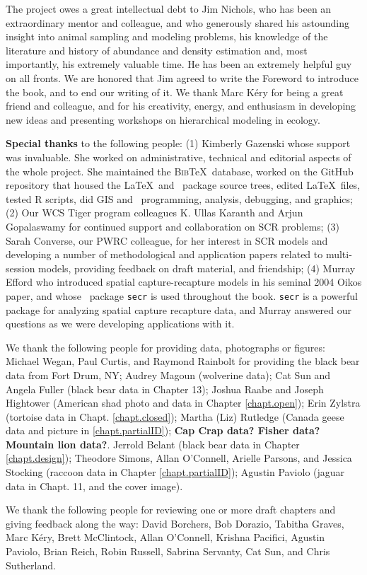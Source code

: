 
The project owes a great intellectual debt to Jim Nichols, who has
been an extraordinary mentor and colleague,
and who %
generously shared his
astounding insight into animal sampling and modeling problems, his
knowledge
of the literature and history of abundance and density estimation
and, most importantly, his extremely valuable time.
He has
been
an %
extremely helpful guy on all fronts. We are honored that Jim
agreed to write the Foreword to introduce the book, and to end our
writing of it.
 We thank Marc K\'{e}ry
for being a great friend and colleague, and for his creativity, %
energy, and enthusiasm in developing new ideas and
presenting workshops on hierarchical modeling in ecology.

{\bf Special thanks} to the following people: (1) Kimberly Gazenski whose support was
invaluable. She worked on administrative, technical and editorial
aspects of the whole project. She maintained the \textsc{Bib}\TeX~database,
worked on the GitHub repository that housed the \LaTeX~and \R~package
source trees, edited \LaTeX~files, tested R scripts, did GIS and
\R~programming, analysis, debugging, and graphics;  (2) Our WCS Tiger
program colleagues K. Ullas Karanth and Arjun Gopalaswamy for
continued support and collaboration on SCR problems;  (3) Sarah
Converse, our PWRC colleague, for her interest in SCR models and
developing a number of methodological and application papers related
to multi-session models, providing feedback on draft material, and
friendship;  (4) Murray Efford who introduced spatial
capture-recapture models %
in his seminal 2004 Oikos paper, and whose \R~package \mbox{\tt secr} is used
throughout the book.  \mbox{\tt secr} is a powerful package for analyzing
spatial capture recapture data, and Murray answered our questions as we
were developing applications with it.


We thank the following people for providing data, photographs or figures:
Michael Wegan, Paul Curtis, and Raymond Rainbolt for providing the black bear data from Fort Drum, NY;
Audrey Magoun (wolverine data); Cat Sun and Angela Fuller (black bear
data in Chapter 13); Joshua Raabe and Joseph Hightower (American shad
photo and data in Chapter \ref{chapt.open}); Erin Zylstra (tortoise
data in Chapt. \ref{chapt.closed}); Martha (Liz) Rutledge (Canada geese
data and picture in \ref{chapt.partialID});  {\bf Cap Crap data?
  Fisher data?  Mountain lion data?}.
Jerrold Belant (black bear data
in Chapter \ref{chapt.design}); Theodore Simons, Allan O'Connell,
Arielle Parsons, and Jessica Stocking (raccoon data in Chapter
\ref{chapt.partialID}); Agustin Paviolo (jaguar data in Chapt. 11, and
the cover image).

We thank the following people for reviewing one or more draft chapters
and giving feedback along the way:
David Borchers,
Bob Dorazio,
Tabitha Graves,
Marc K\'{e}ry,   %
Brett McClintock,
Allan O'Connell,
Krishna Pacifici,
Agustin Paviolo,
Brian Reich,
Robin Russell,
Sabrina Servanty,
Cat Sun,
and
Chris Sutherland.

